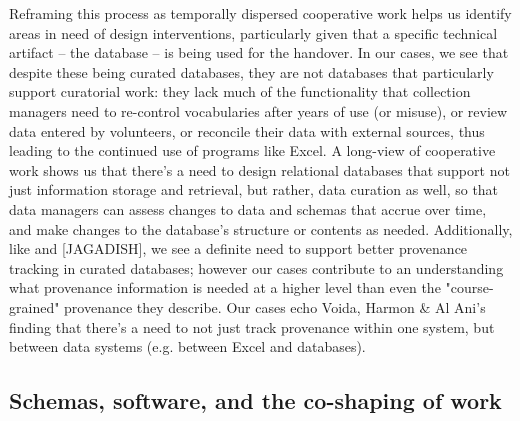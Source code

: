 Reframing this process as temporally dispersed cooperative work helps us identify areas in need of design interventions, particularly given that a specific technical artifact -- the database -- is being used for the handover. In our cases, we see that despite these being curated databases, they are not databases that particularly support curatorial work: they lack much of the functionality that collection managers need to re-control vocabularies after years of use (or misuse), or review data entered by volunteers, or reconcile their data with external sources, thus leading to the continued use of programs like Excel. A long-view of cooperative work shows us that there's a need to design relational databases that support not just information storage and retrieval, but rather, data curation as well, so that data managers can assess changes to data and schemas that accrue over time, and make changes to the database's structure or contents as needed. Additionally, like \cite{Buneman_2006} and [JAGADISH], we see a definite need to support better provenance tracking in curated databases; however our cases contribute to an understanding what provenance information is needed at a higher level than even the "course-grained" provenance they describe. Our cases echo Voida, Harmon & Al Ani's finding that there's a need to not just track provenance within one system, but between data systems (e.g. between Excel and databases).

\subsection{Schemas, software, and the co-shaping of work}

